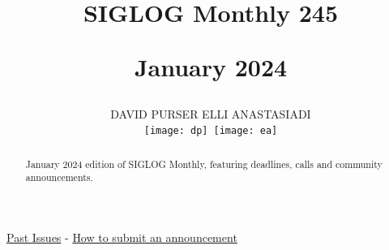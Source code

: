 \documentclass[prodmode,acmtecs]{acmsmall} %
\newcounter{colstart}
\begin{document}
\setcounter{colstart}{\thepage}

\title{{\huge\sc SIGLOG Monthly 245}

 January 2024}
\author{DAVID PURSER
ELLI ANASTASIADI
\vspace*{-2.6cm}\begin{flushright}\texttt{[image: dp]}\ \texttt{[image: ea]}\end{flushright}
}



\begin{abstract}
January 2024 edition of SIGLOG Monthly, featuring deadlines, calls and community announcements.
\end{abstract}


\maketitlee

\href{https://lics.siglog.org/newsletters/}{Past Issues}
 - 
\href{https://lics.siglog.org/newsletters/inst.html}{How to submit an announcement}
\end{document}
